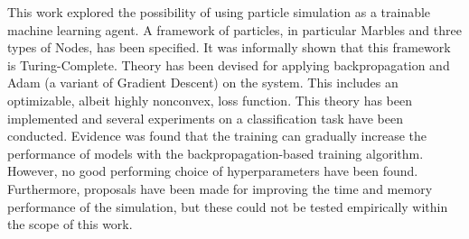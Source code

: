This work explored the possibility of using particle simulation as a trainable machine learning agent.
A framework of particles, in particular Marbles and three types of Nodes, has been specified.
It was informally shown that this framework is Turing-Complete.
Theory has been devised for applying backpropagation and Adam (a variant of Gradient Descent) on the system.
This includes an optimizable, albeit highly nonconvex, loss function.
This theory has been implemented and several experiments on a classification task have been conducted.
Evidence was found that the training can gradually increase the performance of models with the backpropagation-based training algorithm.
However, no good performing choice of hyperparameters have been found.
Furthermore, proposals have been made for improving the time and memory performance of the simulation,
but these could not be tested empirically within the scope of this work.